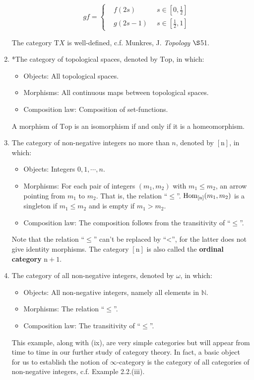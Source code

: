 \begin{example}
\begin{enumerate}[label=(\roman*)]
\begin{itemize}
			\[gf=\left\{
				\begin{aligned}
					&f(2s)\ \ \ \ \ \ \ \ \ \  &s\in[0,\frac{1}{2}]\\
					&g(2s-1)&s\in[\frac{1}{2},1]
				\end{aligned}
			\right.
			\]
		\end{itemize}
	The category $\mathrm{T}X$ is well-defined, c.f. Munkres, J. \textsl{Topology} $\S$51.
	\item *The category of topological spaces, denoted by $\mathrm{Top}$, in which:
		\begin{itemize}
			\item Objects: All topological spaces.
			\item Morphisms: All continuous maps between topological spaces.
			\item Composition law: Composition of set-functions.
		\end{itemize}
	A morphism of $\mathrm{Top}$ is an isomorphism if and only if it is a homeomorphism.
	\item The category of non-negative integers no more than $n$, denoted by $[\mathrm{n}]$, in which:
	 	\begin{itemize}
	 		\item Objects: Integers $0,1,\cdots,n$.
	 		\item Morphisms: For each pair of integers $(m_1,m_2)$ with $m_1\leq m_2$, an arrow pointing from $m_1$ to $m_2$. That is, the relation ``$\leq$''. $\operatorname{Hom}_{[\mathrm{n}]}(m_1,m_2)$ is a singleton if $m_1\leq m_2$ and is empty if $m_1>m_2$.
	 		\item Composition law: The composition follows from the transitivity of ``$\leq$''. 
	 	\end{itemize}
	Note that the relation ``$\leq$'' can't be replaced by ``<'', for the latter does not give identity morphisms. The category $[\mathrm{n}]$ is also called the \textbf{ordinal category} $\mathrm{n+1}$.
	\item The category of all non-negative integers, denoted by $\omega$, in which:
		\begin{itemize}
			\item Objects: All non-negative integers, namely all elements in $\mathbb{N}$.
			\item Morphisms: The relation ``$\leq$''.
			\item Composition law: The transitivity of ``$\leq$''.
		\end{itemize}
	This example, along with (ix), are very simple categories but will appear from time to time in our further study of category theory. In fact, a basic object for us to establish the notion of $\infty$-category is the category of all categories of non-negative integers, c.f. Example 2.2.(iii).
	\end{enumerate}
	\end{example}
